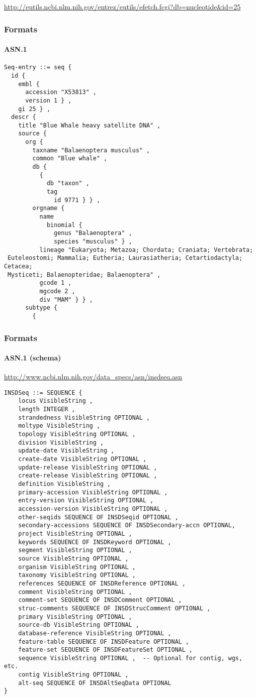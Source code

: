 \documentclass{beamer}
\begin{document}
\begin{frame}[fragile]
\url{http://eutils.ncbi.nlm.nih.gov/entrez/eutils/efetch.fcgi?db=nucleotide&id=25}
\frametitle{Formats}
\framesubtitle{ASN.1}
\begin{lstlisting}[basicstyle=\tiny,breaklines=false]
Seq-entry ::= seq {
  id {
    embl {
      accession "X53813" ,
      version 1 } ,
    gi 25 } ,
  descr {
    title "Blue Whale heavy satellite DNA" ,
    source {
      org {
        taxname "Balaenoptera musculus" ,
        common "Blue whale" ,
        db {
          {
            db "taxon" ,
            tag
              id 9771 } } ,
        orgname {
          name
            binomial {
              genus "Balaenoptera" ,
              species "musculus" } ,
          lineage "Eukaryota; Metazoa; Chordata; Craniata; Vertebrata;
 Euteleostomi; Mammalia; Eutheria; Laurasiatheria; Cetartiodactyla; Cetacea;
 Mysticeti; Balaenopteridae; Balaenoptera" ,
          gcode 1 ,
          mgcode 2 ,
          div "MAM" } } ,
      subtype {
        {
\end{lstlisting}
\end{frame}


\begin{frame}[fragile]
\frametitle{Formats}
\framesubtitle{ASN.1 (schema)}
\url{http://www.ncbi.nlm.nih.gov/data_specs/asn/insdseq.asn}
\begin{lstlisting}[basicstyle=\tiny,breaklines=false]
INSDSeq ::= SEQUENCE {
    locus VisibleString ,
    length INTEGER ,
    strandedness VisibleString OPTIONAL ,
    moltype VisibleString ,
    topology VisibleString OPTIONAL ,
    division VisibleString ,
    update-date VisibleString ,
    create-date VisibleString OPTIONAL ,
    update-release VisibleString OPTIONAL ,
    create-release VisibleString OPTIONAL ,
    definition VisibleString ,
    primary-accession VisibleString OPTIONAL ,
    entry-version VisibleString OPTIONAL ,
    accession-version VisibleString OPTIONAL ,
    other-seqids SEQUENCE OF INSDSeqid OPTIONAL ,
    secondary-accessions SEQUENCE OF INSDSecondary-accn OPTIONAL,
    project VisibleString OPTIONAL ,
    keywords SEQUENCE OF INSDKeyword OPTIONAL ,
    segment VisibleString OPTIONAL ,
    source VisibleString OPTIONAL ,
    organism VisibleString OPTIONAL ,
    taxonomy VisibleString OPTIONAL ,
    references SEQUENCE OF INSDReference OPTIONAL ,
    comment VisibleString OPTIONAL ,
    comment-set SEQUENCE OF INSDComment OPTIONAL ,
    struc-comments SEQUENCE OF INSDStrucComment OPTIONAL ,
    primary VisibleString OPTIONAL ,
    source-db VisibleString OPTIONAL ,
    database-reference VisibleString OPTIONAL ,
    feature-table SEQUENCE OF INSDFeature OPTIONAL ,
    feature-set SEQUENCE OF INSDFeatureSet OPTIONAL ,
    sequence VisibleString OPTIONAL ,  -- Optional for contig, wgs, etc.
    contig VisibleString OPTIONAL ,
    alt-seq SEQUENCE OF INSDAltSeqData OPTIONAL
}
\end{lstlisting}
\end{frame}
\end{document}
